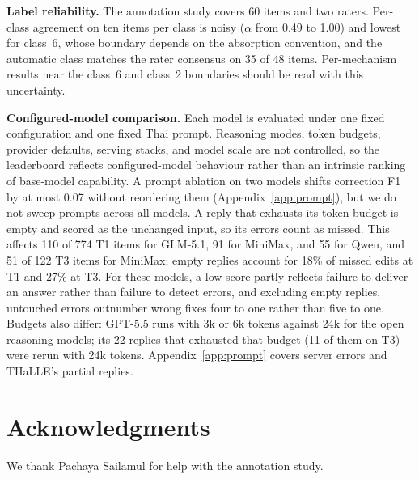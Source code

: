 \documentclass[11pt]{article}
\begin{document}
\textbf{Label reliability.} The annotation study covers 60 items and two raters. Per-class
agreement on ten items per class is noisy ($\alpha$ from 0.49 to 1.00) and lowest for class~6,
whose boundary depends on the absorption convention, and the automatic class matches the rater
consensus on 35 of 48 items. Per-mechanism results near the class~6 and class~2 boundaries
should be read with this uncertainty.

\textbf{Configured-model comparison.} Each model is evaluated under one fixed configuration
and one fixed Thai prompt. Reasoning modes, token budgets, provider defaults, serving stacks,
and model scale are not controlled, so the leaderboard reflects configured-model behaviour
rather than an intrinsic ranking of base-model capability. A prompt ablation on two models
shifts correction F1 by at most 0.07 without reordering them (Appendix~\ref{app:prompt}), but
we do not sweep prompts across all models. A reply that exhausts its token budget is empty and
scored as the unchanged input, so its errors count as missed. This affects 110 of 774 T1 items
for GLM-5.1, 91 for MiniMax, and 55 for Qwen, and 51 of 122 T3 items for MiniMax; empty replies
account for 18\% of missed edits at T1 and 27\% at T3. For these models, a low score partly
reflects failure to deliver an answer rather than failure to detect errors, and excluding empty
replies, untouched errors outnumber wrong fixes four to one rather than five to one. Budgets
also differ: GPT-5.5 runs with 3k or 6k tokens against 24k for the open reasoning models; its
22 replies that exhausted that budget (11 of them on T3) were rerun with 24k tokens. Appendix~\ref{app:prompt} covers server errors and THaLLE's
partial replies.

\section*{Acknowledgments}
We thank Pachaya Sailamul for help with the annotation study.




\appendix
\end{document}
